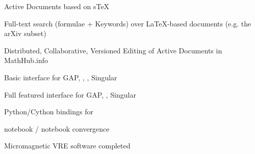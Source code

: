 \begin{workpackage}
\begin{tasklist}
\begin{task}[title=Visualization system for 3d data in web-notebook
,id=vis3d,lead=SR, partners={US,PS,USO}]
%
%
%
%
%
\end{tasklist}

\begin{wpdelivs}
  \begin{wpdeliv}[id=adstex,due=6,nature=R,dissem=PU,lead=JU]
    {Active Documents based on sTeX}
  \end{wpdeliv}
    \begin{wpdeliv}[id=mws,due=9,nature=OTHER,dissem=PU,lead=JU]
      {Full-text search (formulae + Keywords) over LaTeX-based documents
        (e.g. the arXiv subset)}
    \end{wpdeliv}
    \begin{wpdeliv}[id=mathhub-editing,due=12,nature=DEM,dissem=PU,lead=JU]
      {Distributed, Collaborative, Versioned Editing of Active Documents in MathHub.info}
    \end{wpdeliv}
  \begin{wpdeliv}[due=14,id=ipython-kernels-basic,dissem=PU,nature=OTHER,lead=PS]
      {Basic \Jupyter interface for GAP, \PariGP, \Sage, Singular}
  \end{wpdeliv}
  \begin{wpdeliv}[due=12,id=ipython-kernels,dissem=PU,nature=OTHER,lead=PS]
      {Full featured \Jupyter interface for GAP, \PariGP, Singular}
  \end{wpdeliv}
  \begin{wpdeliv}[due=24,id=pari-python-lib,dissem=PU,nature=OTHER,lead=UB]
	  {Python/Cython bindings for \PariGP}
  \end{wpdeliv}

  \begin{wpdeliv}[due=12,id=ipython-kernel-sage,dissem=PU,nature=DEM,lead=PS]
      {\Sage notebook / \Jupyter notebook convergence}
  \end{wpdeliv}
    \begin{wpdeliv}[due=15,id=oommf-nb,dissem=PU,nature=OTHER,lead=USO]
      {Micromagnetic VRE software completed}
    \end{wpdeliv}


\end{wpdelivs}
\end{workpackage}
